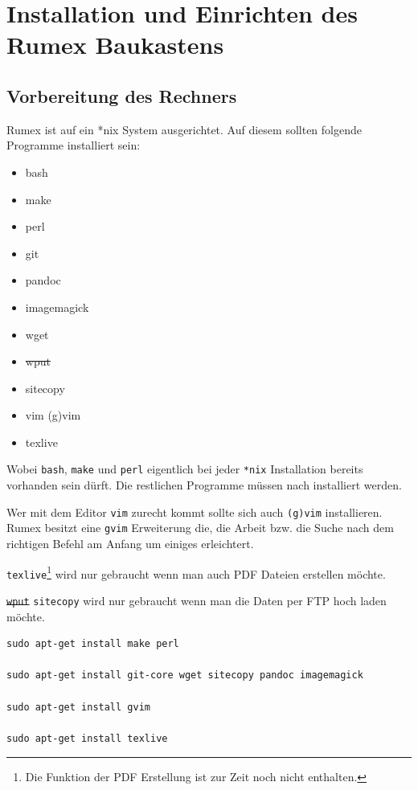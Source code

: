 \documentclass[%
fontsize=12pt,%
parskip=half,%
version=last%
]{scrreprt}
\begin{document}
\section{Installation und Einrichten des Rumex
Baukastens}\label{installation-und-einrichten-des-rumex-baukastens}

\subsection{Vorbereitung des Rechners}\label{vorbereitung-des-rechners}

Rumex ist auf ein *nix System ausgerichtet. Auf diesem sollten folgende
Programme installiert sein:

\begin{itemize}
\item
  bash
\item
  make
\item
  perl
\item
  git
\item
  pandoc
\item
  imagemagick
\item
  wget
\item
  \sout{wput}
\item
  sitecopy
\item
  vim (g)vim
\item
  texlive
\end{itemize}

Wobei \texttt{bash}, \texttt{make} und \texttt{perl} eigentlich bei
jeder \texttt{*nix} Installation bereits vorhanden sein dürft. Die
restlichen Programme müssen nach installiert werden.

Wer mit dem Editor \texttt{vim} zurecht kommt sollte sich auch
\texttt{(g)vim} installieren. Rumex besitzt eine \texttt{gvim}
Erweiterung die, die Arbeit bzw. die Suche nach dem richtigen Befehl am
Anfang um einiges erleichtert.

\texttt{texlive}\footnote{Die Funktion der PDF Erstellung ist zur Zeit
  noch nicht enthalten.} wird nur gebraucht wenn man auch PDF Dateien
erstellen möchte.

\sout{\texttt{wput}} \texttt{sitecopy} wird nur gebraucht wenn man die
Daten per FTP hoch laden möchte.

\begin{verbatim}
sudo apt-get install make perl

sudo apt-get install git-core wget sitecopy pandoc imagemagick

sudo apt-get install gvim

sudo apt-get install texlive
\end{verbatim}
\end{document}

